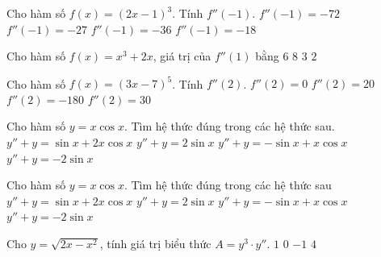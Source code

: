 \begin{ex}%
	Cho hàm số $f(x)=(2x-1)^{3}$.  Tính $f''(-1)$.
	\choice 
		{\True $f''(-1)=-72$} 
		{$f''(-1)=-27$} 
		 {$f''(-1)=-36$}
		{$f''(-1)=-18$} 
\end{ex}

\begin{ex}%
	Cho hàm số $f(x)=x^3+2x$,  giá trị của $f''(1)$ bằng
	\choice 
		{\True $6$} 
		 {$8$}
		{$3$} 
		{$2$} 
\end{ex}

\begin{ex}%
	Cho hàm số  $f(x)=(3x-7)^5$. Tính $f''(2)$.
	 \choice
		 {$f''(2)=0$}
		 {$f''(2)=20$}
		{\True  $f''(2)=-180$}
		{$f''(2)=30$} 
\end{ex}

\begin{ex}%
	 Cho hàm số $y=x\cos x$. Tìm hệ thức đúng trong các hệ thức sau.
	 \choice
		{$y''+y=\sin x+2x\cos x$} 
		 {$y''+y=2\sin x$}
		{$y''+y=-\sin  x+x\cos x$}
		{\True  $y''+y=-2\sin x$}
\end{ex}

\begin{ex}%
	Cho hàm số $ y=x\cos x$. Tìm hệ thức đúng trong các hệ thức sau 
	\choice 
		{$y''+y=\sin x+2x\cos x$} 
		{$y''+y=2\sin x$} 
		{$y''+y=-\sin  x+x\cos x$}
		{\True  $y''+y=-2\sin x$}
\end{ex}

\begin{ex}%
	Cho $ y=\sqrt{2x-x^2}$, tính giá  trị biểu thức $ A=y^3\cdot y''$.
	 \choice
		{$ 1$} 
		{$  0$}
		{\True $-1$} 
		{$4$} 
\end{ex}


